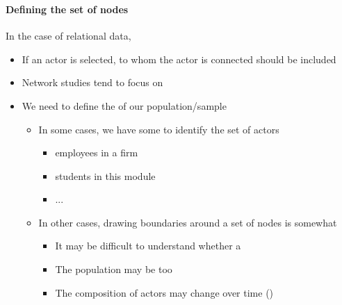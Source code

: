 \documentclass[8pt]{beamer}
\begin{document}
\begin{frame}
\frametitle{\insertsection}
\framesubtitle{Defining the set of nodes}

In the case of relational data, {\color{blue}{we cannot independently sample actors}}
	\begin{itemize}
	\item If an actor is selected, {\color{blue}{all actors}} to whom the actor is connected should be included 
	\item Network studies tend to focus on {\color{blue}{whole populations/samples of convenience}}	
	\item We need to define the {\color{blue}{boundaries}} of our population/sample

		\begin{itemize}
		\item In some cases, we have some {} to identify the set of actors
			\begin{itemize}
			\item employees in a firm
			\item students in this module
			\item ...
			\end{itemize}
	
		\item In other cases, drawing boundaries around a set of nodes is somewhat {\color{blue}{arbitrary}}
			\begin{itemize}
			\item It may be difficult to understand whether a {\color{blue}{an actor belongs to the set}}
			\item The population may be too {\color{blue}{large}}
			\item The composition of actors may change over time ({\color{blue}{joiners and leavers}})
			\end{itemize}
		\end{itemize}
	
	\end{itemize}

\end{frame}

\end{document}
